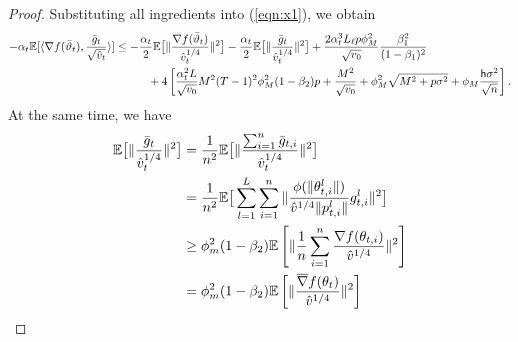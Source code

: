 \documentclass[11pt]{article}
\def\tot{\mathsf{h}}
\begin{document}
\begin{proof}
Substituting all ingredients into (\ref{eqn:x1}), we obtain
\begin{align}\notag
    -\alpha_t \mathbb E[\langle \nabla f(\bar \vartheta_t),\frac{\bar g_t}{\sqrt{\hat v_t}} \rangle] &\leq -\frac{\alpha_t}{2}\mathbb E\big[\Vert \frac{\nabla f(\bar\vartheta_t) }{\hat v_t^{1/4}}\Vert^2 \big]-\frac{\alpha_t}{2}\mathbb E\big[\Vert \frac{\bar g_t }{\hat v_t^{1/4}}\Vert^2 \big]+\frac{2\alpha_t^3 L_\ell p\phi_M^2}{ \sqrt{v_0}}\frac{\beta_1^2}{(1-\beta_1)^2} \\\notag
    &\hspace{0.4in}  + 4 \left[ \frac{\alpha_t^2 L}{\sqrt{v_0}} M^2 (T-1)^2 \phi_M^2 (1-\beta_2)p + \frac{M^2}{\sqrt{v_0}}+\phi_M^2\sqrt{M^2+p\sigma^2} + \phi_M \frac{\tot \sigma^2}{\sqrt{n}}\right].
\end{align}
At the same time, we have
\begin{align}\notag
    \mathbb E\big[\Vert \frac{\bar g_t }{\hat v_t^{1/4}}\Vert^2\big]&=\frac{1}{n^2}\mathbb E\big[\Vert \frac{\sum_{i=1}^n \bar g_{t,i}}{\hat v_t^{1/4}}\Vert^2 \big]\\\notag
    &=\frac{1}{n^2}\mathbb E\big[ \sum_{l=1}^L \sum_{i=1}^n \Vert  \frac{\phi(\Vert \theta_{t,i}^l\Vert)}{\hat v^{1/4} \Vert p_{t,i}^l\Vert}g_{t,i}^l \Vert^2 \big]\\\notag
    &\geq \phi_m^2(1-\beta_2) \mathbb E\left[ \Vert \frac{1}{n}\sum_{i=1}^n \frac{\nabla f(\theta_{t,i})}{\hat v^{1/4}} \Vert^2 \right]\\\notag
    &=\phi_m^2(1-\beta_2) \mathbb E\left[ \Vert  \frac{\overline\nabla f(\theta_{t})}{\hat v^{1/4}} \Vert^2 \right]
\end{align}



\end{proof}
\end{document}
